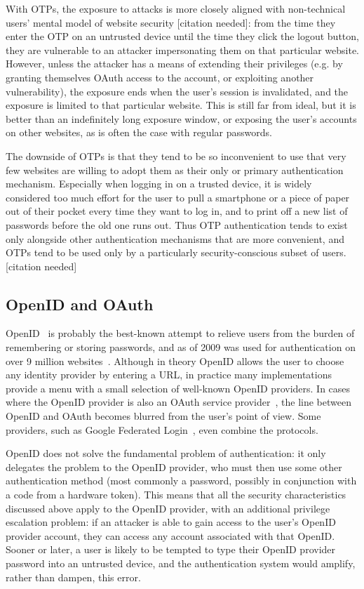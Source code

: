 With OTPs, the exposure to attacks is more closely aligned with non-technical users' mental model of
website security [citation needed]: from the time they enter the OTP on an untrusted device until
the time they click the logout button, they are vulnerable to an attacker impersonating them on that
particular website. However, unless the attacker has a means of extending their privileges (e.g. by
granting themselves OAuth access to the account, or exploiting another vulnerability), the exposure
ends when the user's session is invalidated, and the exposure is limited to that particular website.
This is still far from ideal, but it is better than an indefinitely long exposure window, or
exposing the user's accounts on other websites, as is often the case with regular passwords.

The downside of OTPs is that they tend to be so inconvenient to use that very few websites are
willing to adopt them as their only or primary authentication mechanism. Especially when logging in
on a trusted device, it is widely considered too much effort for the user to pull a smartphone or a
piece of paper out of their pocket every time they want to log in, and to print off a new list of
passwords before the old one runs out. Thus OTP authentication tends to exist only alongside other
authentication mechanisms that are more convenient, and OTPs tend to be used only by a particularly
security-conscious subset of users. [citation needed]

\subsection{OpenID and OAuth}

OpenID~\cite{OpenID} is probably the best-known attempt to relieve users from the burden of
remembering or storing passwords, and as of 2009 was used for authentication on over 9 million
websites~\cite{OpenID09}.  Although in theory OpenID allows the user to choose any identity provider
by entering a URL, in practice many implementations provide a menu with a small selection of
well-known OpenID providers. In cases where the OpenID provider is also an OAuth service
provider~\cite{OAuth}, the line between OpenID and OAuth becomes blurred from the user's point of
view. Some providers, such as Google Federated Login~\cite{GoogleOpenID}, even combine the
protocols.

OpenID does not solve the fundamental problem of authentication: it only delegates the problem to
the OpenID provider, who must then use some other authentication method (most commonly a password,
possibly in conjunction with a code from a hardware token). This means that all the security
characteristics discussed above apply to the OpenID provider, with an additional privilege
escalation problem: if an attacker is able to gain access to the user's OpenID provider account,
they can access any account associated with that OpenID. Sooner or later, a user is likely to be
tempted to type their OpenID provider password into an untrusted device, and the authentication
system would amplify, rather than dampen, this error.

